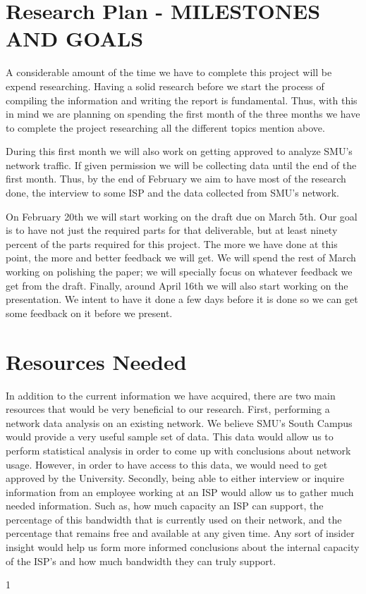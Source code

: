 \documentclass{sigcomm-alternate}
\begin{document}
\section{Research Plan - MILESTONES AND GOALS}
A considerable amount of the time we have to complete this project will be expend researching. Having a solid research before we start the process of compiling the information and writing the report is fundamental. Thus, with this in mind we are planning on spending the first month of the three months we have to complete the project researching all the different topics mention above. 

During this first month we will also work on getting approved to analyze SMU's network traffic. If given permission we will be collecting data until the end of the first month. Thus, by the end of February we aim to have most of the research done, the interview to some ISP and the data collected from SMU's network. 

On February 20th we will start working on the draft due on March 5th. Our goal is to have not just the required parts for that deliverable, but at least ninety percent of the parts required for this project. The more we have done at this point, the more and better feedback we will get. We will spend the rest of March working on polishing the paper; we will specially focus on whatever feedback we get from the draft. Finally, around April 16th we will also start working on the presentation. We intent to have it done a few days before it is done so we can get some feedback on it before we present.  

\section{Resources Needed}
In addition to the current information we have acquired, there are two main resources that would be very beneficial to our research. First, performing a network data analysis on an existing network. We believe SMU's South Campus would provide a very useful sample set of data. This data would allow us to perform statistical analysis in order to come up with conclusions about network usage. However, in order to have access to this data, we would need to get approved by the University. Secondly, being able to either interview or inquire information from an employee working at an ISP would allow us to gather much needed information. Such as, how much capacity an ISP can support, the percentage of this bandwidth that is currently used on their network, and the percentage that remains free and available at any given time. Any sort of insider insight would help us form more informed conclusions about the internal capacity of the ISP's and how much bandwidth they can truly support.





	1
\end{document}
